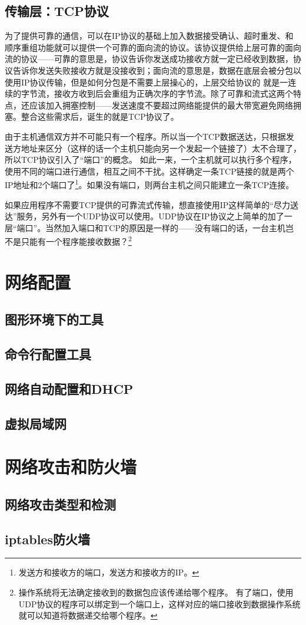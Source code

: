 \subsection{传输层：TCP协议}
为了提供可靠的通信，可以在IP协议的基础上加入数据接受确认、超时重发、和顺序重组功能就可以提供一个可靠的面向流的协议。该协议提供给上层可靠的面向流的协议——可靠的意思是，协议告诉你发送成功接收方就一定已经收到数据，协议告诉你发送失败接收方就是没接收到；面向流的意思是，数据在底层会被分包以使用IP协议传输，但是如何分包是不需要上层操心的，上层交给协议的 就是一连续的字节流，接收方收到后会重组为正确次序的字节流。除了可靠和流式这两个特点，还应该加入拥塞控制——发送速度不要超过网络能提供的最大带宽避免网络拥塞。整合这些需求后，诞生的就是TCP协议了。

由于主机通信双方并不可能只有一个程序。所以当一个TCP数据送达，只根据发送方地址来区分（这样的话一个主机只能向另一个发起一个链接了）太不合理了，所以TCP协议引入了“端口”的概念。
如此一来，一个主机就可以执行多个程序，使用不同的端口进行通信，相互之间不干扰。这样确定一条TCP链接的就是两个IP地址和2个端口了\footnote{发送方和接收方的端口，发送方和接收方的IP。}。如果没有端口，则两台主机之间只能建立一条TCP连接。

如果应用程序不需要TCP提供的可靠流式传输，想直接使用IP这样简单的“尽力送达”服务，另外有一个UDP协议可以使用。UDP协议在IP协议之上简单的加了一层“端口”。当然加入端口和TCP的原因是一样的——没有端口的话，一台主机岂不是只能有一个程序能接收数据？\footnote{操作系统将无法确定接收到的数据包应该传递给哪个程序。
有了端口，使用UDP协议的程序可以绑定到一个端口上，这样对应的端口接收到数据操作系统就可以知道将数据递交给哪个程序。}


\section{网络配置}\label{sec:ifconfig}
\subsection{图形环境下的工具}
\subsection{命令行配置工具}
\subsection{网络自动配置和DHCP}\label{sec:DHCP}

\subsection{虚拟局域网}

\section{网络攻击和防火墙}
\subsection{网络攻击类型和检测}
\subsection{iptables防火墙}